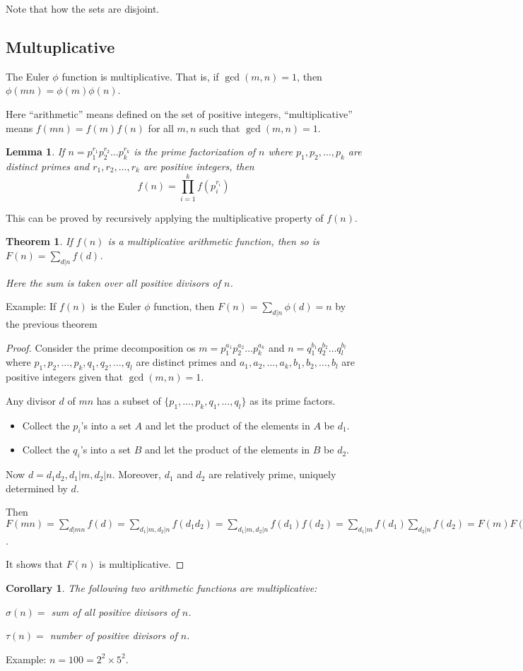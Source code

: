 \documentclass[letterpaper,12pt,oneside]{article}
\newtheorem{theorem}{Theorem}
\newtheorem*{corollary}{Corollary}
\newtheorem*{lemma}{Lemma}
\begin{document}
Note that how the sets are disjoint. 
\subsection{Multuplicative}
The Euler $\phi$ function is multiplicative. That is, if $\gcd(m,n)=1$, then $\phi(mn)=\phi(m)\phi(n)$.

Here ``arithmetic'' means defined on the set of positive integers, ``multiplicative'' means $f(mn)=f(m)f(n)$ for all $m,n$ such that $\gcd(m,n)=1$.
\begin{lemma}
    If $n=p_1^{r_1}p_2^{r_2}\ldots p_k^{r_k}$ is the prime factorization of $n$ where $p_1,p_2,\ldots,p_k$ are distinct primes and $r_1,r_2,\ldots,r_k$ are positive integers, then \[
        f(n)=\prod_{i=1}^k f(p_i^{r_i})
    \]
\end{lemma}
This can be proved by recursively applying the multiplicative property of $f(n)$.

\begin{theorem}
    If $f(n)$ is a multiplicative arithmetic function, then so is $F(n)=\sum_{d|n}f(d)$.

    Here the sum is taken over all positive divisors of $n$.
\end{theorem}
Example: If $f(n)$ is the Euler $\phi$ function, then $F(n)=\sum_{d|n}\phi(d)=n$ by the previous theorem
\begin{proof}
    Consider the prime decomposition os $m= p_1^{a_1}p_2^{a_2}\ldots p_k^{a_k}$ and $n= q_1^{b_1}q_2^{b_2}\ldots q_l^{b_l}$ where $p_1,p_2,\ldots,p_k,q_1,q_2,\ldots,q_l$ are distinct primes and $a_1,a_2,\ldots,a_k,b_1,b_2,\ldots,b_l$ are positive integers given that $\gcd(m,n)=1$.

    Any divisor $d$ of $mn$ has a subset of $\{p_1,\ldots,p_k,q_1,\ldots,q_l\}$ as its prime factors. \begin{itemize}
        \item Collect the $p_i$'s into a set $A$ and let the product of the elements in $A$ be $d_1$.
        \item Collect the $q_i$'s into a set $B$ and let the product of the elements in $B$ be $d_2$.
    \end{itemize}
    Now $d=d_1 d_2, d_1|m, d_2|n$. Moreover, $d_1$ and $d_2$ are relatively prime, uniquely determined by $d$. 

    Then $F(mn)=\sum_{d|mn}f(d)=\sum_{d_1|m,d_2|n}f(d_1d_2)=\sum_{d_1|m,d_2|n}f(d_1)f(d_2)=\sum_{d_1|m}f(d_1)\sum_{d_2|n}f(d_2)=F(m)F(n)$.

    It shows that $F(n)$ is multiplicative.
\end{proof}
\begin{corollary}
    The following two arithmetic functions are multiplicative:

    $\sigma(n) = $ sum of all positive divisors of $n$.

    $\tau(n) = $ number of positive divisors of $n$.
\end{corollary}
Example: $n=100=2^2\times 5^2$. 
\end{document}
